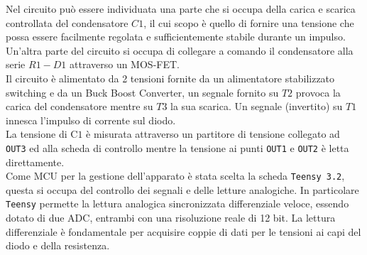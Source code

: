\documentclass{article}[a4paper, oneside, 11pt]
\begin{document}
Nel circuito può essere individuata una parte che si occupa della carica e 
scarica controllata del condensatore $C1$, il cui scopo è quello di fornire una 
tensione che possa essere facilmente regolata e sufficientemente stabile 
durante un impulso. Un'altra parte del circuito si occupa di collegare a 
comando il condensatore alla serie $R1-D1$ attraverso un MOS-FET.\\
Il circuito è alimentato da 2 tensioni fornite da un alimentatore stabilizzato 
switching e da un Buck Boost Converter, un segnale fornito su $T2$ provoca la 
carica del condensatore mentre su $T3$ la sua scarica. Un segnale (invertito) su 
$T1$ innesca l'impulso di corrente sul diodo.\\
La tensione di C$1$ è misurata attraverso un partitore di tensione collegato ad 
\verb+OUT3+ ed alla scheda di controllo mentre la tensione ai punti \verb+OUT1+ e
\verb+OUT2+ è letta direttamente.\\
Come MCU per la gestione dell'apparato è stata scelta la scheda 
\verb+Teensy 3.2+\cite{teensy}, questa si occupa del controllo dei segnali e delle letture 
analogiche. In particolare \verb+Teensy+  permette la lettura analogica 
sincronizzata differenziale veloce, essendo dotato di due ADC, entrambi con una 
risoluzione reale di 12 bit. La lettura differenziale è fondamentale per 
acquisire coppie di dati per le tensioni ai capi del diodo e della 
resistenza.
\end{document}
